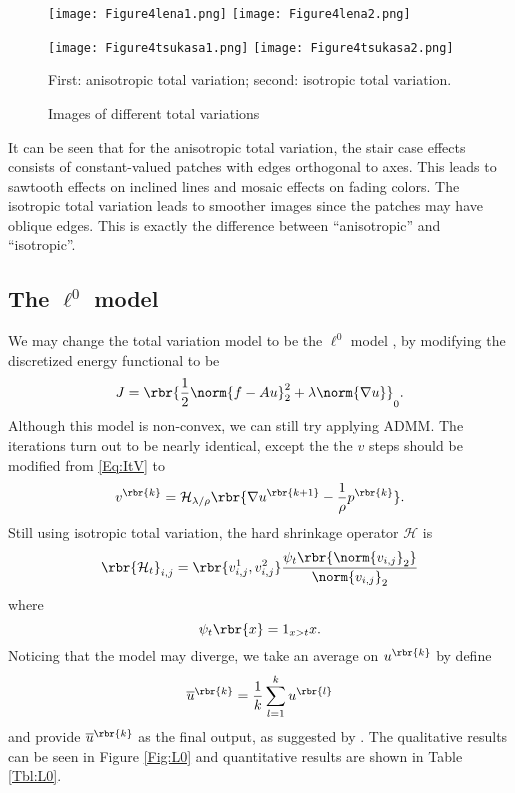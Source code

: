 \documentclass[english, nochinese]{pnote}
\begin{document}
\begin{figure}[htbp]
{
\centering

\texttt{[image: Figure4lena1.png]}
\texttt{[image: Figure4lena2.png]}

\texttt{[image: Figure4tsukasa1.png]}
\texttt{[image: Figure4tsukasa2.png]}

\caption{Images of different total variations}
\label{Fig:Iso}
}
{
\footnotesize First: anisotropic total variation; second: isotropic total variation.
}
\end{figure}

It can be seen that for the anisotropic total variation, the stair case effects consists of constant-valued patches with edges orthogonal to axes. This leads to sawtooth effects on inclined lines and mosaic effects on fading colors. The isotropic total variation leads to smoother images since the patches may have oblique edges. This is exactly the difference between ``anisotropic'' and ``isotropic''.

\subsection{The $\ell^0$ model}

We may change the total variation model to be the $\ell^0$ model \parencite{xu_image_2011} \parencite{dong_efficient_2013}, by modifying the discretized energy functional to be
\begin{equation}
J = \rbr{ \frac{1}{2} \norm{ f - A u }_2^2 + \lambda \norm{ \nabla u } }_0.
\end{equation}
Although this model is non-convex, we can still try applying ADMM. The iterations turn out to be nearly identical, except the the $v$ steps should be modified from \eqref{Eq:ItV} to
\begin{equation}
v^{\rbr{k}} = \mathcal{H}_{ \lambda / \rho } \rbr{ \nabla u^{\rbr{ k + 1 }} - \frac{1}{\rho} p^{\rbr{k}} }.
\end{equation}
Still using isotropic total variation, the hard shrinkage operator $\mathcal{H}$ is
\begin{equation}
\rbr{ \mathcal{H}_t }_{ i, j } = \rbr{ v_{ i, j }^1, v_{ i, j }^2 } \frac{ \psi_t \rbr{\norm{v_{ i, j }}_2} }{\norm{v_{ i, j }}_2}
\end{equation}
where
\begin{equation}
\psi_t \rbr{x} = 1_{ x > t } x.
\end{equation}
Noticing that the model may diverge, we take an average on $u^{\rbr{k}}$ by define
\begin{equation}
\overline{u}^{\rbr{k}} = \frac{1}{k} \sum_{ l = 1 }^k u^{\rbr{l}}
\end{equation}
and provide $\overline{u}^{\rbr{k}}$ as the final output, as suggested by \parencite{dong_efficient_2013}. The qualitative results can be seen in Figure \ref{Fig:L0} and quantitative results are shown in Table \ref{Tbl:L0}.
\end{document}
